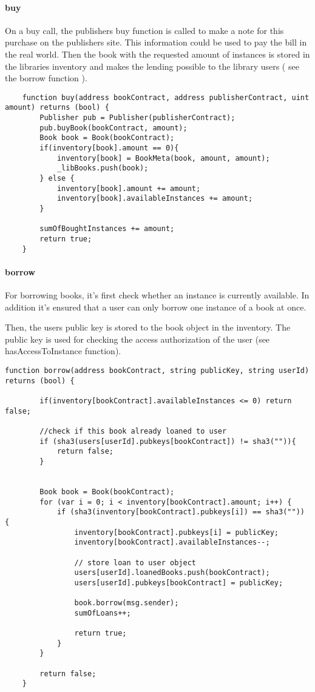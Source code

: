\paragraph*{buy}
On a buy call, the publishers buy function is called to make a note for this purchase on the publishers site. This information could be used to pay the bill in the real world.
Then the book with the requested amount of instances is stored in the libraries inventory and makes the lending possible to the library users ( see the borrow function ).

\begin{lstlisting}
	function buy(address bookContract, address publisherContract, uint amount) returns (bool) {
		Publisher pub = Publisher(publisherContract);
		pub.buyBook(bookContract, amount);
        Book book = Book(bookContract);
        if(inventory[book].amount == 0){
            inventory[book] = BookMeta(book, amount, amount);
		    _libBooks.push(book);
		} else {
            inventory[book].amount += amount;
            inventory[book].availableInstances += amount;
		}

		sumOfBoughtInstances += amount;
		return true;
	}
\end{lstlisting}


\paragraph*{borrow}
For borrowing books, it's first check whether an instance is currently available. In addition it's ensured that a user can only borrow one instance of a book at once.

Then, the users public key is stored to the book object in the inventory. The public key is used for checking the access authorization of the user (see hasAccessToInstance function).

\begin{lstlisting}
function borrow(address bookContract, string publicKey, string userId) returns (bool) {

		if(inventory[bookContract].availableInstances <= 0) return false;

		//check if this book already loaned to user
        if (sha3(users[userId].pubkeys[bookContract]) != sha3("")){
            return false;
        }


		Book book = Book(bookContract);
        for (var i = 0; i < inventory[bookContract].amount; i++) {
            if (sha3(inventory[bookContract].pubkeys[i]) == sha3("")) {
                inventory[bookContract].pubkeys[i] = publicKey;
                inventory[bookContract].availableInstances--;

                // store loan to user object
                users[userId].loanedBooks.push(bookContract);
                users[userId].pubkeys[bookContract] = publicKey;

                book.borrow(msg.sender);
                sumOfLoans++;

                return true;
            }
        }

        return false;
	}
\end{lstlisting}

